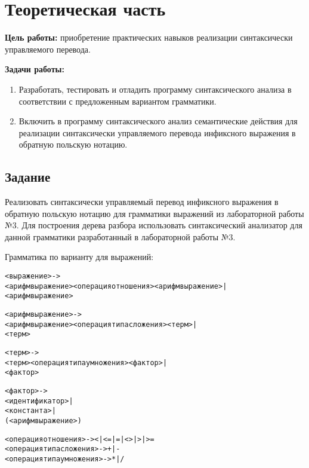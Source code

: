 \section{Теоретическая часть}

\textbf{Цель работы:} приобретение практических навыков реализации синтаксически управляемого перевода.

\textbf{Задачи работы:}

\begin{enumerate}
	\item Разработать, тестировать и отладить программу синтаксического анализа в соответствии с предложенным вариантом грамматики.
	\item Включить в программу синтаксического анализ семантические действия для реализации синтаксически управляемого перевода инфиксного выражения в обратную польскую нотацию.
\end{enumerate}

\subsection{Задание}

Реализовать синтаксически управляемый перевод инфиксного выражения в обратную польскую нотацию для грамматики выражений из лабораторной работы №3. Для построения дерева разбора использовать синтаксический анализатор для данной грамматики разработанный в лабораторной работы №3.

Грамматика по варианту для выражений:

\begin{framed}
\ttfamily 
\begin{alltt}
<выражение> -> 
    <арифм выражение> <операция отношения> <арифм выражение> | 
    <арифм выражение> 

<арифм выражение> -> 
    <арифм выражение> <операция типа сложения> <терм> | 
    <терм> 

<терм> -> 
    <терм> <операция типа умножения> <фактор> | 
    <фактор> 

<фактор> -> 
    <идентификатор> | 
    <константа> | 
    ( <арифм выражение> ) 

<операция отношения> -> < | <= | = | <> | > | >= 
<операция типа сложения> -> + | - 
<операция типа умножения> -> * | / 
\end{alltt}
\end{framed}

\newpage